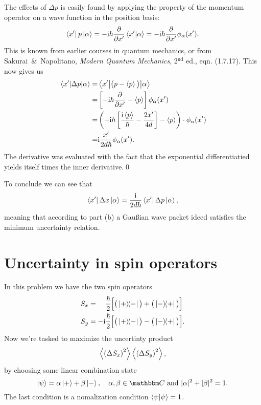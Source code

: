 \documentclass[11pt,letter, swedish, english
]{article}
\begin{document}
The effects of $\Delta{p}$ is easily found by applying the property of
the momentum operator on a wave function in the position basis:
\begin{equation}
\bra{x'}p\ket{\alpha} = -\mathrm{i}\hbar \pdv{x'} \braket{x'}{\alpha} 
= -\mathrm{i}\hbar \pdv{x'} \phi_\alpha(x').
\end{equation}
This is known from earlier courses in quantum mechanics, or from
Sakurai~\&~Napolitano, \textit{Modern Quantum Mechanics}, 2$^\text{nd}$
ed., eqn. (1.7.17). This now gives us
\begin{equation}
\begin{aligned}
\mel{x'}{\Delta{p}}{\alpha} =& \mel**{x'}{\big(p-\ev{p}\big)}{\alpha}\\
=& \left[-\ii\hbar \pdv{x'} - \ev{p}\right] \phi_\alpha(x')\\
=& \left(
   -\ii\hbar\left[ \frac{\ii\ev{p}}{\hbar} - \frac{2x'}{4d}\right] 
   - \ev{p}\right)\cdot \phi_\alpha(x')\\
=& \ii\frac{x'}{2d\hbar}\phi_\alpha(x').
\end{aligned}
\end{equation}
The derivative was evaluated with the fact that the exponential
differentiatied yields itself times the inner derivative.\qed

To conclude we can see that
\begin{equation}
\bra{x'}\Delta{x}\ket{\alpha} = \frac{\mathrm{i}}{2d\hbar} \bra{x'}\Delta{p}\ket{\alpha},
\end{equation}
meaning that according to part (b) a Gaußian wave packet ideed
satisfies the minimum uncertainty relation.



\section{Uncertainty in spin operators}
In this problem we have the two spin operators
\begin{equation}
\begin{aligned}
S_x &= \phantom{-\ii}\frac{\hbar}{2}\Big[\big(\ketbra{+}{-}\big) + \big(\ketbra{-}{+}\big) \Big]\\
S_y &= -\ii\frac{\hbar}{2}\Big[\big(\ketbra{+}{-}\big) - \big(\ketbra{-}{+}\big) \Big].
\end{aligned}
\end{equation}
Now we're tasked to maximize the uncertinty product
\begin{equation}
\ev{\left(\Delta{S_x}\right)^2}\ev{\left(\Delta{S_y}\right)^2},
\end{equation}
by choosing some linear combination state
\begin{equation}
\ket{\psi}=\alpha\ket{+}+\beta\ket{-} 
   \qcomma \alpha,\beta\in\C \text{ and } |\alpha|^2+|\beta|^2 = 1.
\end{equation}
The last condition is a nomalization condition $\braket{\psi}=1$.
\end{document}
